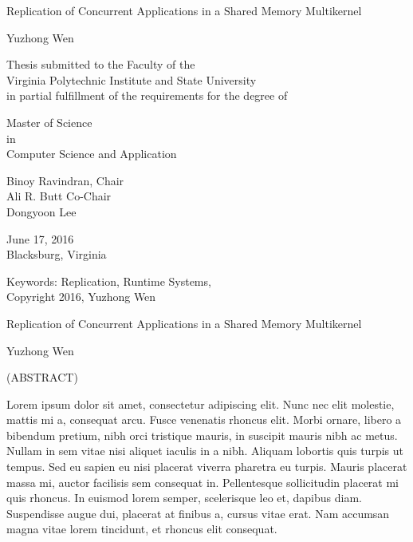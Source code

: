 \documentclass[12pt]{report}
\begin{document}
\thispagestyle{empty}
\begin{center}

{\Large 
Replication of Concurrent Applications in a Shared Memory Multikernel
}

\vfill

Yuzhong Wen

\vfill

Thesis submitted to the Faculty of the \\
Virginia Polytechnic Institute and State University \\
in partial fulfillment of the requirements for the degree of

\vfill

Master of Science \\
in \\
Computer Science and Application

\vfill

Binoy Ravindran, Chair \\
Ali R. Butt Co-Chair \\
Dongyoon Lee

\vfill

June 17, 2016 \\
Blacksburg, Virginia

\vfill

Keywords: Replication, Runtime Systems, 
\\
Copyright 2016, Yuzhong Wen

\end{center}

\pagebreak

\thispagestyle{empty}
\begin{center}

{\large Replication of Concurrent Applications in a Shared Memory Multikernel}

\vfill

Yuzhong Wen

\vfill

(ABSTRACT)

\vfill

\end{center}

Lorem ipsum dolor sit amet, consectetur adipiscing elit. Nunc nec elit molestie, mattis mi a, consequat arcu. Fusce venenatis rhoncus elit. Morbi ornare, libero a bibendum pretium, nibh orci tristique mauris, in suscipit mauris nibh ac metus. Nullam in sem vitae nisi aliquet iaculis in a nibh. Aliquam lobortis quis turpis ut tempus. Sed eu sapien eu nisi placerat viverra pharetra eu turpis. Mauris placerat massa mi, auctor facilisis sem consequat in. Pellentesque sollicitudin placerat mi quis rhoncus. In euismod lorem semper, scelerisque leo et, dapibus diam. Suspendisse augue dui, placerat at finibus a, cursus vitae erat. Nam accumsan magna vitae lorem tincidunt, et rhoncus elit consequat.
\end{document}
